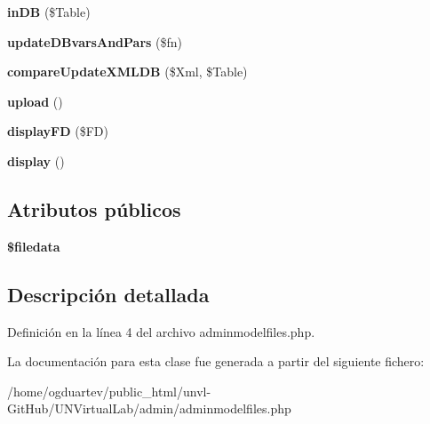 \begin{DoxyCompactItemize}
{\bfseries in\+DB} (\$Table)
\item 
\mbox{\label{classadminmodelfiles_a9ded5ca54c1ed7fe34cc831224576918}} 
{\bfseries update\+D\+Bvars\+And\+Pars} (\$fn)
\item 
\mbox{\label{classadminmodelfiles_aa36b9b08512d363174d08c8711576c3a}} 
{\bfseries compare\+Update\+X\+M\+L\+DB} (\$Xml, \$Table)
\item 
\mbox{\label{classadminmodelfiles_a75b3c881bbfa514acd88bc32597cba84}} 
{\bfseries upload} ()
\item 
\mbox{\label{classadminmodelfiles_acd1759b4b15d819f14316280f3f87c29}} 
{\bfseries display\+FD} (\$FD)
\item 
\mbox{\label{classadminmodelfiles_a9aeb4f143fd7967234ac65e070baff8a}} 
{\bfseries display} ()
\end{DoxyCompactItemize}
\subsection*{Atributos públicos}
\begin{DoxyCompactItemize}
\item 
\mbox{\label{classadminmodelfiles_ac58f67d34dfa2c233883023b3787ead0}} 
{\bfseries \$filedata}
\end{DoxyCompactItemize}


\subsection{Descripción detallada}


Definición en la línea 4 del archivo adminmodelfiles.\+php.



La documentación para esta clase fue generada a partir del siguiente fichero\+:\begin{DoxyCompactItemize}
\item 
/home/ogduartev/public\+\_\+html/unvl-\/\+Git\+Hub/\+U\+N\+Virtual\+Lab/admin/adminmodelfiles.\+php\end{DoxyCompactItemize}
